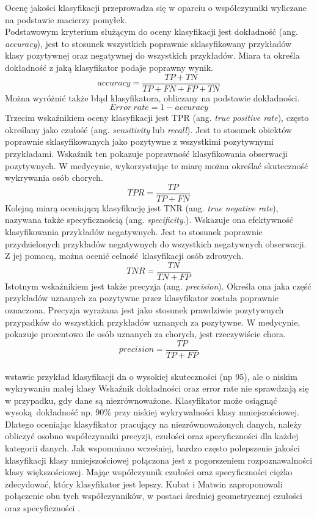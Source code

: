Ocenę jakości klasyfikacji przeprowadza się w oparciu o współczynniki wyliczane na podstawie macierzy pomyłek.\\
Podstawowym kryterium służącym do oceny klasyfikacji jest dokładność (ang. \textit{accuracy}), jest to stosunek wszystkich poprawnie sklasyfikowany przykładów klasy pozytywnej oraz negatywnej do wszystkich przykładów. Miara ta określa dokładność z jaką klasyfikator podaje poprawny wynik.
\[accuracy = \frac{TP + TN}{TP + FN + FP + TN}\]
Można wyróżnić także błąd klasyfikatora, obliczany na podstawie dokładności.
\[Error\ rate = 1 - accuracy\label{error_rate}\]
Trzecim wskaźnikiem oceny klasyfikacji jest TPR (ang. \textit{true positive rate}), często określany jako czułość (ang. \textit{sensitivity} lub \textit{recall}). Jest to stosunek obiektów poprawnie sklasyfikowanych jako pozytywne z wszystkimi pozytywnymi przykładami. Wskaźnik ten pokazuje poprawność klasyfikowania obserwacji pozytywnych. W medycynie, wykorzystując te miarę można określać skuteczność wykrywania osób chorych.
\[TPR = \frac{TP}{TP + FN}\]
Kolejną miarą oceniającą klasyfikację jest TNR (ang. \textit{true negative rate}), nazywana także specyficznością (ang. \textit{specificity.}). Wskazuje ona efektywność klasyfikowania przykładów negatywnych. Jest to stosunek poprawnie przydzielonych przykładów negatywnych do wszystkich negatywnych obserwacji. Z jej pomocą, można ocenić celność klasyfikacji osób zdrowych.
\[TNR = \frac{TN}{TN + FP}\]
Istotnym wskaźnikiem jest także precyzja (ang. \textit{precision}). Określa ona jaka część przykładów uznanych za pozytywne przez klasyfikator została poprawnie oznaczona. Precyzja wyrażana jest jako stosunek prawdziwie pozytywnych przypadków do wszystkich przykładów uznanych za pozytywne. W medycynie, pokazuje procentowo ile osób uznanych za chorych, jest rzeczywiście chora.
\[precision = \frac{TP}{TP + FP}\]\\
 wstawic przykład klasyfikacji dn o wysokiej skuteczności (np 95), ale o niskim wykrywaniu małej klasy
Wskaźnik dokładności oraz error rate nie sprawdzają się w przypadku, gdy dane są niezrównoważone. Klasyfikator może osiągnąć wysoką dokładność np. 90\% przy niskiej wykrywalności klasy mniejszościowej.
Dlatego oceniając klasyfikator pracujący na niezrównoważonych danych, należy obliczyć osobno współczynniki precyzji, czułości oraz specyficzności dla każdej kategorii danych. Jak wspomniano wcześniej, bardzo często polepszenie jakości klasyfikacji klasy mniejszościowej połączona jest z pogorszeniem rozpoznawalności klasy większościowej. Mając współczynnik czułości oraz specyficzności ciężko zdecydować, który klasyfikator jest lepszy. Kubat i Matwin zaproponowali połączenie obu tych współczynników, w postaci średniej geometrycznej czułości oraz specyficzności \cite{KubatMatwin}. 
